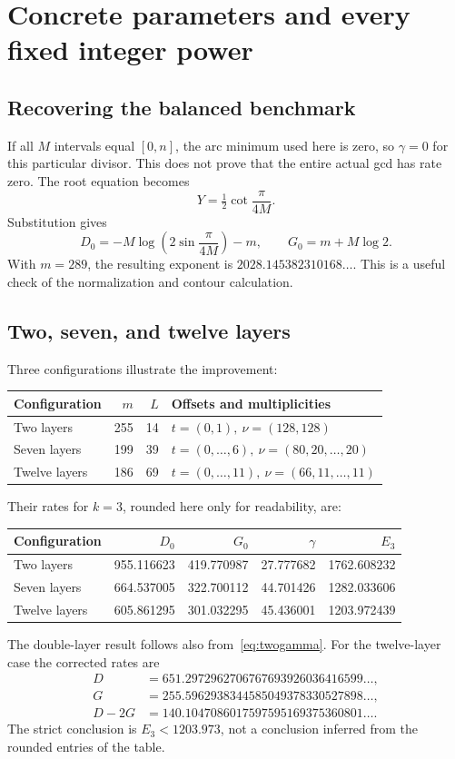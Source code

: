 \section{Concrete parameters and every fixed integer power}
\label{sec:parameters}

\subsection{Recovering the balanced benchmark}

If all \(M\) intervals equal \([0,n]\), the arc minimum used here is
zero, so \(\gamma=0\) for this particular divisor. This does not
prove that the entire actual gcd has rate zero.
The root equation becomes
\[
Y=\tfrac12\cot\frac{\pi}{4M}.
\]
Substitution gives
\[
D_0=-M\log\left(2\sin\frac{\pi}{4M}\right)-m,\qquad
G_0=m+M\log2.
\]
With \(m=289\), the resulting exponent is
\(2028.145382310168\ldots\).
This is a useful check of the normalization and contour calculation.

\subsection{Two, seven, and twelve layers}

Three configurations illustrate the improvement:
\begin{center}
\begin{tabular}{lrrl}
\toprule
Configuration&\(m\)&\(L\)&Offsets and multiplicities\\
\midrule
Two layers&255&14&\(t=(0,1),\ \nu=(128,128)\)\\
Seven layers&199&39&\(t=(0,\ldots,6),\ \nu=(80,20,\ldots,20)\)\\
Twelve layers&186&69&\(t=(0,\ldots,11),\ \nu=(66,11,\ldots,11)\)\\
\bottomrule
\end{tabular}
\end{center}
Their rates for \(k=3\), rounded here only for readability, are:
\begin{center}
\begin{tabular}{lrrrr}
\toprule
Configuration&\(D_0\)&\(G_0\)&\(\gamma\)&\(E_3\)\\
\midrule
Two layers&955.116623&419.770987&27.777682&1762.608232\\
Seven layers&664.537005&322.700112&44.701426&1282.033606\\
Twelve layers&605.861295&301.032295&45.436001&1203.972439\\
\bottomrule
\end{tabular}
\end{center}
The double-layer result follows also from~\eqref{eq:twogamma}.
For the twelve-layer case the corrected rates are
\begin{align*}
D&=651.2972962706767693926036416599\ldots,\\
G&=255.5962938344585049378330527898\ldots,\\
D-2G&=140.1047086017597595169375360801\ldots.
\end{align*}
The strict conclusion is \(E_3<1203.973\), not a conclusion inferred
from the rounded entries of the table.


